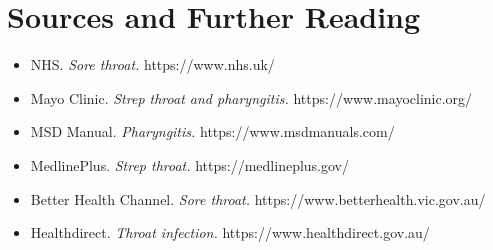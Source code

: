 \section*{Sources and Further Reading}
\begin{itemize}
    \item NHS. \textit{Sore throat.} https://www.nhs.uk/
    \item Mayo Clinic. \textit{Strep throat and pharyngitis.} https://www.mayoclinic.org/
    \item MSD Manual. \textit{Pharyngitis.} https://www.msdmanuals.com/
    \item MedlinePlus. \textit{Strep throat.} https://medlineplus.gov/
    \item Better Health Channel. \textit{Sore throat.} https://www.betterhealth.vic.gov.au/
    \item Healthdirect. \textit{Throat infection.} https://www.healthdirect.gov.au/
\end{itemize}
